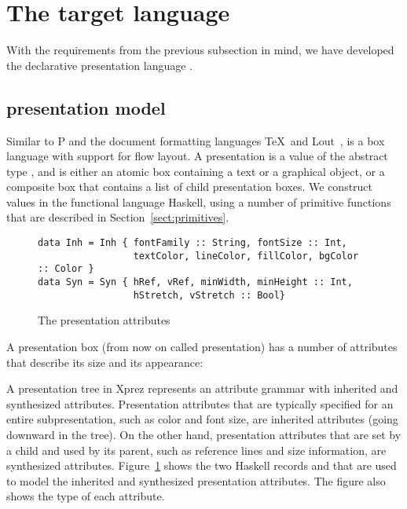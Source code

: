 %																
%																
%																
\section{The {\Xprez} target language} \label{sect:xpreztarget}

With the requirements from the previous subsection in mind, we have developed the declarative presentation language {\Xprez}. 

%																
\subsection{{\Xprez} presentation model}

Similar to P and the document formatting languages \TeX ~and Lout~\cite{kingston93lout}, {\Xprez} is a box language with support for flow layout. A presentation is a value of the abstract type , and is either an atomic box containing a text or a graphical object, or a composite box that contains a list of child presentation boxes.  We construct  values in the functional language Haskell, using a number of primitive functions that are described in Section~\ref{sect:primitives}.

\begin{figure}
\begin{small}
\begin{center}
\begin{small}
\begin{verbatim}
data Inh = Inh { fontFamily :: String, fontSize :: Int,
                 textColor, lineColor, fillColor, bgColor :: Color } 
data Syn = Syn { hRef, vRef, minWidth, minHeight :: Int,
                 hStretch, vStretch :: Bool}
\end{verbatim}
\end{small}
\caption{The {\Xprez} presentation attributes}\label{xprezattributes} 
\end{center}
\end{small}
\end{figure}


A presentation box (from now on called presentation) has a number of attributes that describe its size and its appearance: 

\begin{center}
\end{center}

A presentation tree in {Xprez} represents an attribute grammar with inherited and synthesized attributes. Presentation attributes that are typically specified for an entire subpresentation, such as color and font size, are inherited attributes  \bc (going downward in the tree)\ec. On the other hand, presentation attributes that are set by a child and used by its parent, such as  reference lines and size information, are synthesized attributes. Figure~\ref{xprezattributes} shows the two Haskell records   and  that are used to model the inherited and synthesized presentation attributes. The figure also shows the type of each attribute. 

